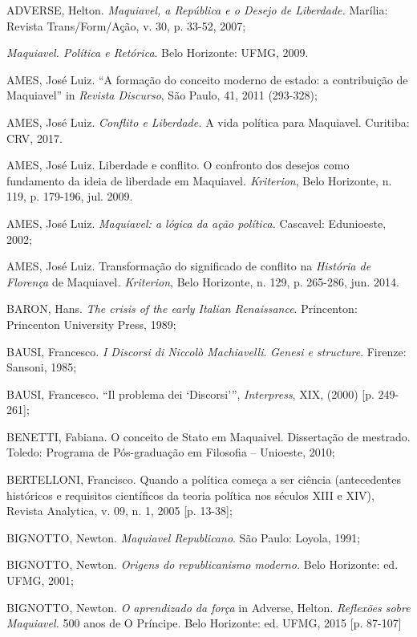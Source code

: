 \begin{Parskip}
ADVERSE, Helton. \emph{Maquiavel, a República e o Desejo de Liberdade.}
Marília: Revista Trans/Form/Ação, v. 30, p. 33-52, 2007;

\emph{Maquiavel. Política e Retórica}. Belo Horizonte: UFMG, 2009.

AMES, José Luiz. ``A formação do conceito moderno de estado: a
contribuição de Maquiavel'' in \emph{Revista Discurso}, São Paulo, 41,
2011 (293-328);

AMES, José Luiz. \emph{Conflito e Liberdade.} A vida política para
Maquiavel. Curitiba: CRV, 2017.

AMES, José Luiz. Liberdade e conflito. O confronto dos desejos como
fundamento da ideia de liberdade em Maquiavel\emph{. Kriterion}, Belo
Horizonte, n. 119, p. 179-196, jul. 2009.

AMES, José Luiz. \emph{Maquiavel: a lógica da ação política.} Cascavel:
Edunioeste, 2002;

AMES, José Luiz. Transformação do significado de conflito na
\emph{História de Florença} de Maquiavel\emph{. Kriterion}, Belo
Horizonte, n. 129, p. 265-286, jun. 2014.

BARON, Hans. \emph{The crisis of the early Italian Renaissance}.
Princenton: Princenton University Press, 1989;

BAUSI, Francesco. \emph{I Discorsi di Niccolò Machiavelli}. \emph{Genesi
e structure}. Firenze: Sansoni, 1985;

BAUSI, Francesco. ``Il problema dei `Discorsi''', \emph{Interpress},
XIX, (2000) {[}p. 249-261{]};

BENETTI, Fabiana. O conceito de Stato em Maquaivel. Dissertação de
mestrado. Toledo: Programa de Pós-graduação em Filosofia -- Unioeste,
2010;

BERTELLONI, Francisco. Quando a política começa a ser ciência
(antecedentes históricos e requisitos científicos da teoria política nos
séculos XIII e XIV), Revista Analytica, v. 09, n. 1, 2005 {[}p.
13-38{]};

BIGNOTTO, Newton. \emph{Maquiavel Republicano}. São Paulo: Loyola, 1991;

BIGNOTTO, Newton. \emph{Origens do republicanismo moderno.} Belo
Horizonte: ed. UFMG, 2001;

BIGNOTTO, Newton. \emph{O aprendizado da força} in Adverse, Helton.
\emph{Reflexões sobre Maquiavel.} 500 anos de O Príncipe. Belo
Horizonte: ed. UFMG, 2015 {[}p. 87-107{]}


\end{Parskip}
